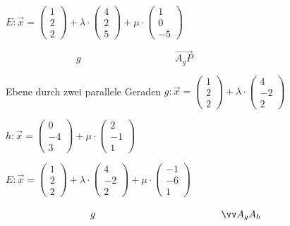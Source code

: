 \documentclass[paper=a6,landscape,ngerman,twoside=true,fontsize=12pt]{scrartcl}
\begin{document}
\begin{antwort}
	
	$E:\vec{x}=\left(\begin{array}{c} 1 \\ 2 \\ 2\end{array} \right)+\lambda \cdot \left(\begin{array}{c} 4 \\ 2 \\ 5\end{array} \right)+\mu \cdot \left(\begin{array}{c} 1 \\0 \\ -5\end{array} \right)$
	\bigskip
	
	$\hspace{3cm} g  \hspace{4cm} \vec{A_gP}$
	
\end{antwort}	
\begin{frage}
	\LARGE
	Ebene durch zwei parallele Geraden
	\large
	$g:\vec{x}=\left(\begin{array}{c} 1 \\ 2 \\ 2\end{array} \right)+\lambda \cdot \left(\begin{array}{c} 4 \\ -2 \\ 2\end{array} \right)$
	
	$h:\vec{x}=\left(\begin{array}{c} 0 \\ -4 \\ 3\end{array} \right)+\mu \cdot \left(\begin{array}{c} 2 \\ -1 \\ 1\end{array} \right)$
\end{frage}
\begin{antwort}
	
	$E:\vec{x}=\left(\begin{array}{c} 1 \\ 2 \\ 2\end{array} \right)+\lambda \cdot \left(\begin{array}{c} 4 \\ -2 \\ 2\end{array} \right)+\mu \cdot \left(\begin{array}{c} -1 \\-6 \\ 1\end{array} \right)$
	\bigskip
	
	$\hspace{3cm} g  \hspace{4.5cm} \vec{A_gA_h}$
	
\end{antwort}	
\end{document}
